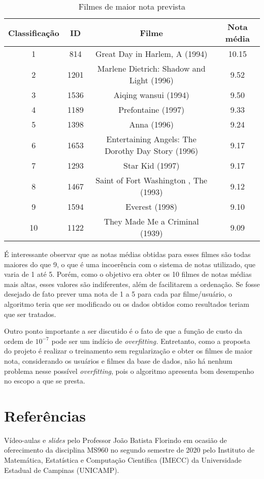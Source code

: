 \documentclass[12pt]{article}
\begin{document}
\begin{table} [h]
\begin{tabular}{cccc}
\hline 
Classificação & ID & Filme & Nota média\\
\hline
1 & 814 & Great Day in Harlem,  A (1994) & 10.15\\
2 & 1201 & Marlene Dietrich: Shadow and Light (1996)  & 9.52\\
3 & 1536 & Aiqing wansui (1994) & 9.50\\
4 & 1189 & Prefontaine (1997) & 9.33\\
5 & 1398 & Anna (1996) & 9.24\\
6 & 1653 & Entertaining Angels: The Dorothy Day Story (1996) & 9.17\\
7 & 1293 & Star Kid (1997) & 9.17\\
8 & 1467 & Saint of Fort Washington ,  The (1993) & 9.12\\
9 & 1594 & Everest (1998) & 9.10\\
10 & 1122 & They Made Me a Criminal (1939) & 9.09\\
\hline 
\end{tabular} 
\caption{Filmes de maior nota prevista}
\label{tabela_rec}
\end{table}

É interessante observar que as notas médias obtidas para esses filmes são todas maiores do que 9, o que é uma incoerência com o sistema de notas utilizado, que varia de 1 até 5. Porém, como o objetivo era obter os 10 filmes de notas médias mais altas, esses valores são indiferentes, além de facilitarem a ordenação. Se fosse desejado de fato prever uma nota de 1 a 5 para cada par filme/usuário, o algoritmo teria que ser modificado ou os dados obtidos como resultados teriam que ser tratados.

Outro ponto importante a ser discutido é o fato de que a função de custo da ordem de $10^{-7}$ pode ser um indício de \textit{overfitting.} Entretanto, como a proposta do projeto é realizar o treinamento sem regularização e obter os filmes de maior nota, considerando os usuários e filmes da base de dados, não há nenhum problema nesse possível \textit{overfitting}, pois o algoritmo apresenta bom desempenho no escopo a que se presta.

\section{Referências}
Vídeo-aulas e \textit{slides} pelo Professor João Batista Florindo em ocasião de oferecimento da disciplina MS960 no segundo semestre de 2020 pelo Instituto de Matemática, Estatística e Computação Científica (IMECC) da Universidade Estadual de Campinas (UNICAMP).
\end{document}
